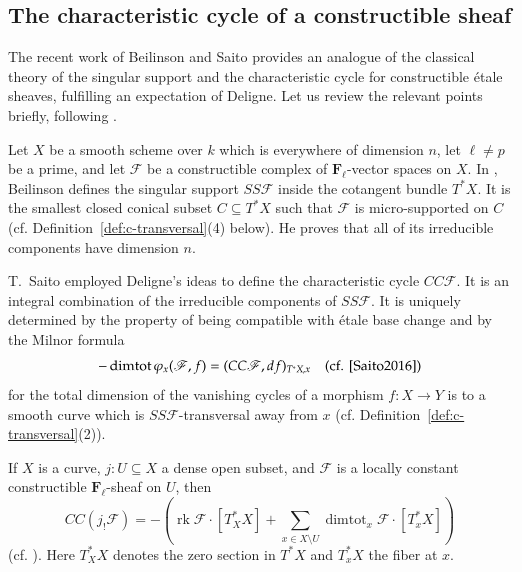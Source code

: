 \documentclass[twoside]{amsart}
\newcommand{\FF}{\mathbf{F}}
\newcommand{\Ff}{\mathscr{F}}
\DeclareMathOperator{\dimtot}{dimtot}
\DeclareMathOperator{\rk}{rk}
\renewcommand{\phi}{\varphi}
\renewcommand{\to}{\longrightarrow}
\theoremstyle{plain}
\theoremstyle{definition}
\theoremstyle{remark}
\numberwithin{equation}{subsection}
\begin{document}
\subsection{The characteristic cycle of a constructible sheaf}

The recent work of Beilinson \cite{Beilinson} and Saito \cite{Saito2016} provides an analogue of the classical theory of the singular support and the characteristic cycle \cite[Chapter IX]{KashiwaraShapira} for constructible \'etale sheaves, fulfilling an expectation of Deligne. Let us review the relevant points briefly, following \cite{Saito2016}.

Let $X$ be a smooth scheme over $k$ which is everywhere of dimension $n$, let $\ell\neq p$ be a prime, and let $\Ff$ be a constructible complex of $\FF_\ell$-vector spaces on $X$. In \cite{Beilinson}, Beilinson defines the singular support $SS\Ff$ inside the cotangent bundle $T^* X$. It is the smallest closed conical subset $C\subseteq T^* X$ such that $\Ff$ is micro-supported on $C$ (cf. Definition~\ref{def:c-transversal}(4) below). He proves that all of its irreducible components have dimension $n$.

T.~Saito \cite{Saito2016} employed Deligne's ideas to define the characteristic cycle $CC\Ff$. It is an integral combination of the irreducible components of $SS\Ff$. It is uniquely determined by the property of being compatible with \'etale base change and by the Milnor formula 
\[ 
	-\dimtot \phi_x (\Ff, f) = (CC\Ff, df)_{T^* X, x}
	\quad
	\text{(cf. \cite[5.15]{Saito2016})}
\]
for the total dimension of the vanishing cycles of a morphism $f\colon X\to Y$ is to a smooth curve which is $SS\Ff$-transversal away from $x$ (cf. Definition~\ref{def:c-transversal}(2)).

If $X$ is a curve, $j\colon U\subseteq X$ a dense open subset, and $\Ff$ is a locally constant constructible $\FF_\ell$-sheaf on $U$, then
\[ 
	CC(j_! \Ff) = -\left(\rk \Ff \cdot [T^*_X X] + \sum_{x\in X\setminus U} \dimtot_x \Ff \cdot [T^*_x X]\right) 
\]
(cf. \cite[Lemma~5.11.3]{Saito2016}). Here $T^*_X X$ denotes the zero section in $T^* X$ and $T^*_x X$ the fiber at $x$.
\end{document}
